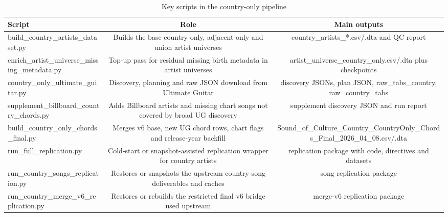 \begin{table}[H]
\centering
\caption{Key scripts in the country-only pipeline}
\label{tab:script_map}
\begin{tabular}{lcc}
\toprule
Script & Role & Main outputs \\
\midrule
build\_country\_artists\_dataset.py & Builds the base country-only, adjacent-only and union artist universes & country\_artists\_*.csv/.dta and QC report \\
enrich\_artist\_universe\_missing\_metadata.py & Top-up pass for residual missing birth metadata in artist universes & artist\_universe\_country\_only.csv/.dta plus checkpoints \\
country\_only\_ultimate\_guitar.py & Discovery, planning and raw JSON download from Ultimate Guitar & discovery JSONs, plan JSON, raw\_tabs\_country, raw\_country\_tabs \\
supplement\_billboard\_country\_chords.py & Adds Billboard artists and missing chart songs not covered by broad UG discovery & supplement discovery JSON and run report \\
build\_country\_only\_chords\_final.py & Merges v6 base, new UG chord rows, chart flags and release-year backfill & Sound\_of\_Culture\_Country\_CountryOnly\_Chords\_Final\_2026\_04\_08.csv/.dta \\
run\_full\_replication.py & Cold-start or snapshot-assisted replication wrapper for country artists & replication package with code, directives and datasets \\
run\_country\_songs\_replication.py & Restores or snapshots the upstream country-song deliverables and caches & song replication package \\
run\_country\_merge\_v6\_replication.py & Restores or rebuilds the restricted final v6 bridge used upstream & merge-v6 replication package \\
\bottomrule
\end{tabular}
\end{table}
